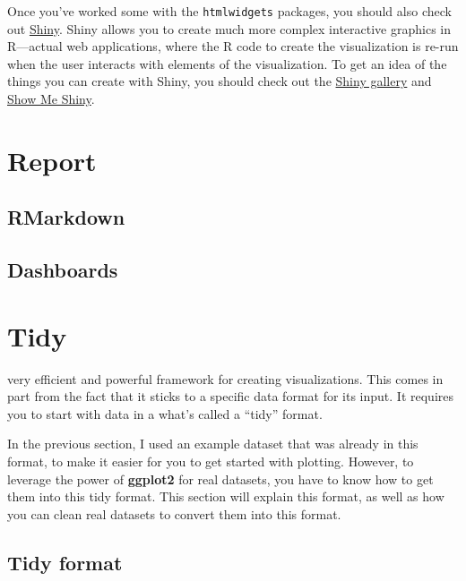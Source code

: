 \documentclass[]{tufte-book}
\begin{document}
Once you've worked some with the \texttt{htmlwidgets} packages, you should also check out
\href{https://shiny.rstudio.com/}{Shiny}. Shiny allows you to create much more complex
interactive graphics in R---actual
web applications, where the R code to create the visualization is re-run when the user
interacts with elements of the visualization. To get an idea of the things you can
create with Shiny, you should check out the \href{https://shiny.rstudio.com/gallery/}{Shiny gallery}
and \href{https://www.showmeshiny.com/}{Show Me Shiny}.

\hypertarget{report}{%
\chapter{Report}\label{report}}

\hypertarget{rmarkdown}{%
\section{RMarkdown}\label{rmarkdown}}

\hypertarget{dashboards}{%
\section{Dashboards}\label{dashboards}}

\hypertarget{tidy}{%
\chapter{Tidy}\label{tidy}}

 very efficient and powerful
framework for
creating visualizations. This comes in part from the fact that it sticks
to a specific data format for its input. It requires you to start with
data in a what's called a ``tidy'' format.

In the previous section, I used an example dataset that was already in this
format, to make it easier for you to get started with plotting. However,
to leverage the power of \textbf{ggplot2} for real datasets, you have to know
how to get them into this tidy format. This section will explain this format,
as well as how you can clean real datasets to convert them into this format.

\hypertarget{tidy-format}{%
\section{Tidy format}\label{tidy-format}}
\end{document}
